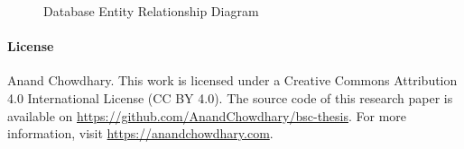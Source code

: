 \documentclass{article}
\begin{document}
\begin{figure}[!hb]
  \caption{Database Entity Relationship Diagram}
\end{figure}

\newpage



\paragraph{License}

\textcopyright {} Anand Chowdhary. This work is licensed under a Creative Commons Attribution 4.0 International License (CC BY 4.0). The source code of this research paper is available on \url{https://github.com/AnandChowdhary/bsc-thesis}. For more information, visit \url{https://anandchowdhary.com}.
\end{document}
